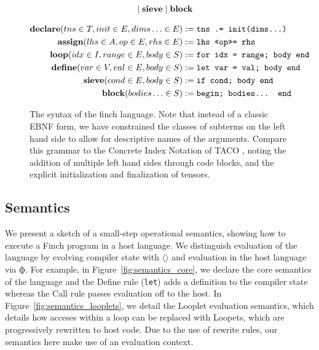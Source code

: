\begin{figure}
\begin{minipage}{0.5\linewidth}
\begin{align*}
        &\quad \mid \text{\textbf{sieve}} \mid \text{\textbf{block}} \\
\end{align*}
\end{minipage}%
\begin{align*}
    \text{\textbf{declare}}(tns \in T, init \in E, dims\ldots \in E) &:= \text{\texttt{tns .= init(dims...)}} \\
    \text{\textbf{assign}}(lhs \in A, op \in E, rhs \in E) &:= \text{\texttt{lhs <<op>>= rhs}} \\
    \text{\textbf{loop}}(idx \in I, range \in E, body \in S) &:= \text{\texttt{for idx = range; body end}} \\
    \text{\textbf{define}}(var \in V, val \in E, body \in S) &:= \text{\texttt{let var = val; body end}} \\
    \text{\textbf{sieve}}(cond \in E, body \in S) &:= \text{\texttt{if cond; body end}} \\
    \text{\textbf{block}}(bodies\ldots \in S) &:= \text{\texttt{begin; bodies... end}}
\end{align*}
\caption{The syntax of the finch language. Note that instead of a classic EBNF
form, we have constrained the classes of subterms on the left hand side to allow
for descriptive names of the arguments. Compare this grammar to the Concrete
Index Notation of TACO \cite[Figure~3]{kjolstad_tensor_2019}, noting the
addition of multiple left hand sides through code blocks, and the explicit
initialization and finalization of tensors.}\label{fig:syntax}
\end{figure}

\subsection{Semantics}

We present a sketch of a small-step operational semantics, showing how to execute a Finch program in a host language.
%
We distinguish evaluation of the language by evolving compiler state with $\langle \rangle$ and evaluation in the host language via $\llangle\rrangle$.
%
For example, in Figure~\ref{fig:semantics_core}, we declare the core semantics of the language and the Define rule (\texttt{let}) adds a definition to the compiler state whereas the Call rule passes evaluation off to the host.
%
In Figure~\ref{fig:semantics_looplets}, we detail the Looplet evaluation semantics, which details how acceses within a loop can be replaced with Loopets, which are progressively rewritten to host code.
%
Due to the use of rewrite rules, our semantics here make use of an evaluation context.


